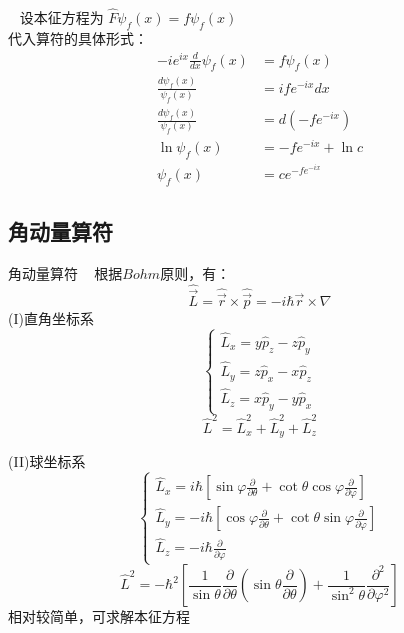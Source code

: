 \begin{frame} 
    \frametitle{}
    \解~ 设本征方程为 $\hat{F}\psi_f(x)=f\psi_f(x)$\\
    代入算符的具体形式：
    \begin{equation*}
        \begin{split}
            -ie^{ix}\frac{d}{dx}\psi_f(x)&=f\psi_f(x) \\
            \frac{d\psi_f(x)}{\psi_f(x)}&=ife^{-ix} dx \\
            \frac{d\psi_f(x)}{\psi_f(x)}&=d(-fe^{-ix}) \\
           \ln{\psi_f(x)}&=-fe^{-ix}+\ln c \\
           \psi_f(x)&=c e^{-fe^{-ix}}
        \end{split} 
    \end{equation*}
\end{frame} 

\subsection{角动量算符}

\begin{frame} {角动量算符}
    \解~ 根据$Bohm$原则，有：
    $$\hat{\vec{L}}=\hat{\vec{r}}\times\hat{\vec{p}}= -i\hbar \vec{r}\times\nabla$$
    (I)直角坐标系
    $$
    \left \{
    \begin{array}{l} 
        \hat{L}_x=y\hat{p}_z-z\hat{p}_y  \\ 
        \hat{L}_y=z\hat{p}_x-x\hat{p}_z  \\ 
        \hat{L}_z=x\hat{p}_y-y\hat{p}_x 
    \end{array}
    \right.
    $$ \vspace{0.3em}
    $$ \hat{L}^2= \hat{L}_x ^2+ \hat{L}_y ^2 +\hat{L}_z ^2  $$
\end{frame} 

\begin{frame} 
    (II)球坐标系\\
    $$
    \left\{\begin{array}{l}
        \hat{L}_{x}=i \hbar\left[\sin \varphi \frac{\partial}{\partial \theta}+\cot \theta \cos \varphi \frac{\partial}{\partial \varphi}\right] \\
        \hat{L}_{y}=-i \hbar\left[\cos \varphi \frac{\partial}{\partial \theta}+\cot \theta \sin \varphi \frac{\partial}{\partial \varphi}\right] \\
        \hat{L}_{z}=-i \hbar \frac{\partial}{\partial \varphi}
        \end{array}\right.
    $$
    $$ \hat{L}^{2}=-\hbar^{2}\left[\frac{1}{\sin \theta} \frac{\partial}{\partial \theta}\left(\sin \theta \frac{\partial}{\partial \theta}\right)+\frac{1}{\sin ^{2} \theta} \frac{\partial^{2}}{\partial \varphi^{2}}\right] $$
    相对较简单，可求解本征方程
\end{frame} 

